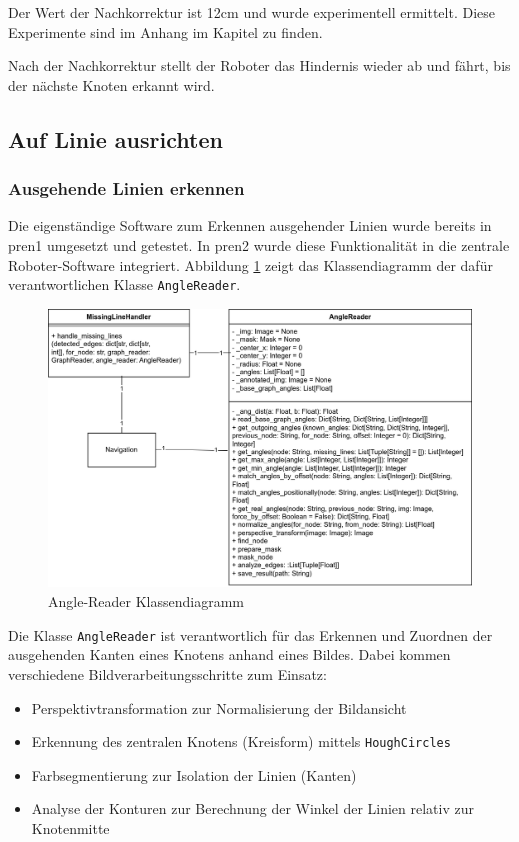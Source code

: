 Der Wert der Nachkorrektur ist 12cm und wurde experimentell ermittelt. Diese Experimente sind im Anhang im Kapitel  zu finden.

Nach der Nachkorrektur stellt der Roboter das Hindernis wieder ab und fährt, bis der nächste Knoten erkannt wird.


\newpage
\subsection{Auf Linie ausrichten}



\subsubsection{Ausgehende Linien erkennen}
\label{outgoing-lines}

Die eigenständige Software zum Erkennen ausgehender Linien wurde bereits in \acrshort{pren1} umgesetzt und getestet. In \acrshort{pren2} wurde diese Funktionalität in die zentrale Roboter-Software integriert. Abbildung \ref{fig:angle-reader-classdiagramm} zeigt das Klassendiagramm der dafür verantwortlichen Klasse \verb|AngleReader|.

\begin{figure}[H]
    \centering
    \includegraphics[width=1\linewidth]{assets/IT/robot-sw-architecture-node_reader_angles.png}
    \caption{Angle-Reader Klassendiagramm}
    \label{fig:angle-reader-classdiagramm}
\end{figure}

Die Klasse \verb|AngleReader| ist verantwortlich für das Erkennen und Zuordnen der ausgehenden Kanten eines Knotens anhand eines Bildes. Dabei kommen verschiedene Bildverarbeitungsschritte zum Einsatz: 
\begin{itemize}
    \item Perspektivtransformation zur Normalisierung der Bildansicht
    \item Erkennung des zentralen Knotens (Kreisform) mittels \verb|HoughCircles|
    \item Farbsegmentierung zur Isolation der Linien (Kanten)
    \item Analyse der Konturen zur Berechnung der Winkel der Linien relativ zur Knotenmitte
\end{itemize}

